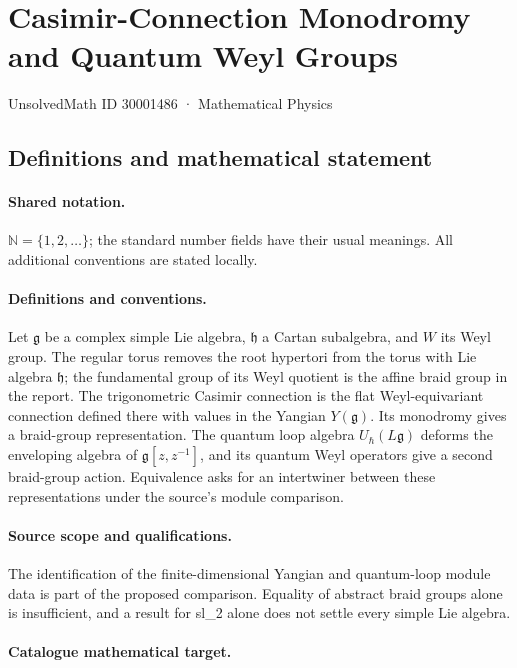 \documentclass[11pt]{article}
\begin{document}
\setcounter{section}{30001485}
\section{Casimir-Connection Monodromy and Quantum Weyl Groups}\label{30001486}
{\small UnsolvedMath ID 30001486 · Mathematical Physics}
\subsection{Definitions and mathematical statement}

\paragraph{Shared notation.}$\mathbb N=\{1,2,\ldots\}$; the standard number fields have their usual meanings. All additional conventions are stated locally.


\paragraph{Definitions and conventions.} Let $\mathfrak g$ be a complex simple Lie algebra, $\mathfrak h$ a Cartan subalgebra, and $W$ its Weyl group. The regular torus removes the root hypertori from the torus with Lie algebra $\mathfrak h$; the fundamental group of its Weyl quotient is the affine braid group in the report. The trigonometric Casimir connection is the flat Weyl-equivariant connection defined there with values in the Yangian $Y(\mathfrak g)$. Its monodromy gives a braid-group representation. The quantum loop algebra $U_\hbar(L\mathfrak g)$ deforms the enveloping algebra of $\mathfrak g[z,z^{-1}]$, and its quantum Weyl operators give a second braid-group action. Equivalence asks for an intertwiner between these representations under the source's module comparison.

\paragraph{Source scope and qualifications.} The identification of the finite-dimensional Yangian and quantum-loop module data is part of the proposed comparison. Equality of abstract braid groups alone is insufficient, and a result for sl\_2 alone does not settle every simple Lie algebra.

\paragraph{Catalogue mathematical target.}
\end{document}
